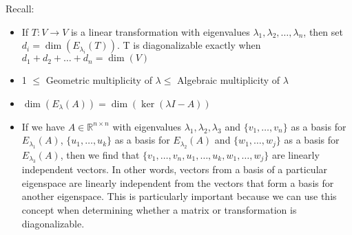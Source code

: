 \documentclass{report}
\begin{document}
\begin{note}
Recall:
\begin{itemize}
\item If $T: V \rightarrow V$ is a linear transformation with eigenvalues $\lambda_1, \lambda_2, \ldots, \lambda_n$, then set $d_i=\operatorname{dim}(E_{\lambda_{i}}(T))$. T is diagonalizable exactly when $d_1 + d_2 + \ldots + d_n = \operatorname{dim}(V)$
\item 1 $\le$ Geometric multiplicity of $\lambda \le$ Algebraic multiplicity of $\lambda$
\item $\dim(E_\lambda(A)) = \dim(\ker(\lambda I - A))$
\item If we have $A\in\mathbb{R}^{n\times n}$ with eigenvalues $\lambda_1,  \lambda_2, \lambda_3$ and $\{v_1,\ldots,v_n\}$ as a basis for $E_{\lambda_1}(A)$,  $\{u_1,\ldots,u_k\}$ as a basis for $E_{\lambda_2}(A)$ and $\{w_1,\ldots,w_j\}$ as a basis for $E_{\lambda_3}(A)$,  then we find that $\{v_1,\ldots,v_n,u_1,\ldots,u_k,w_1,\ldots,w_j\}$ are linearly independent vectors.  In other words,  vectors from a basis of a particular eigenspace are linearly independent from the vectors that form a basis for another eigenspace.  This is particularly important because we can use this concept when determining whether a matrix or transformation is diagonalizable.
\end{itemize}
\end{note}
\end{document}
